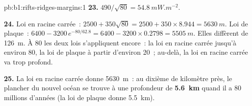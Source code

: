 \begin{solution}{pb:b1:rifts-ridges-margins:1}
\textbf{23.} $490/\sqrt{80} = \qty{54.8}{mW.m^{-2}}$.

\textbf{24.} Loi en racine carrée~: $2500 + 350\sqrt{80} = 2500 + 350\times8.944 =
\qty{5630}{m}$. Loi de plaque~: $6400 - 3200\,e^{-80/62.8} = 6400 - 3200\times0.2798
= \qty{5505}{m}$. Elles diffèrent de \qty{126}{m}. À \qty{80}{\Ma} les deux lois
s'appliquent encore~: la loi en racine carrée jusqu'à environ \qty{80}{\Ma}, la loi de plaque à partir d'environ
\qty{20}{\Ma}~; au-delà, la loi en racine carrée va trop profond.

\textbf{25.} La loi en racine carrée donne \qty{5630}{m}~: au dixième de
kilomètre près, le plancher du nouvel océan se trouve à une profondeur de
\textbf{\qty[text-series-to-math=true]{5.6}{km}} quand il a 80 millions d'années
(la loi de plaque donne \qty{5.5}{km}).
\end{solution}
